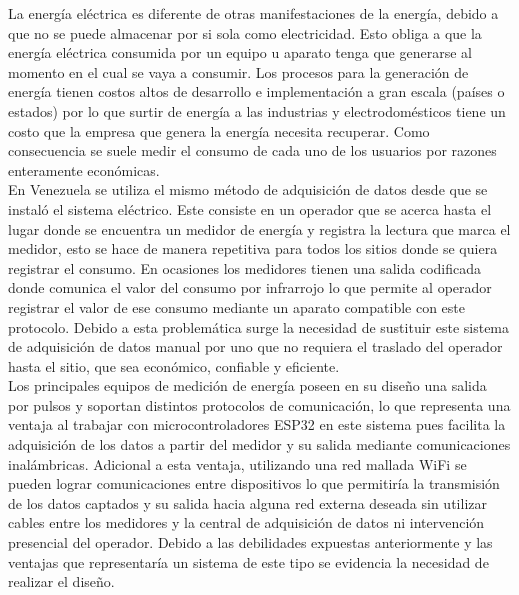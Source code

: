 \documentclass[12pt,letterpaper]{article}
\begin{document}
\vspace{0.3cm}

La energía eléctrica es diferente de otras manifestaciones de la energía, debido a que no se puede almacenar por si sola como electricidad. Esto obliga a que la energía eléctrica consumida por un equipo u aparato tenga que generarse al momento en el cual se vaya a consumir. Los procesos para la generación de energía tienen costos altos de desarrollo e implementación a gran escala (países o estados) por lo que surtir de energía a las industrias y electrodomésticos tiene un costo que la empresa que genera la energía necesita recuperar. Como consecuencia se suele medir el consumo de cada uno de los usuarios por razones enteramente económicas.\\


En Venezuela se utiliza el mismo método de adquisición de datos desde que se instaló el sistema eléctrico. Este consiste en un operador que se acerca hasta el lugar donde se encuentra un medidor de energía y registra la lectura que marca el medidor, esto se hace de manera repetitiva para todos los sitios donde se quiera registrar el consumo. En ocasiones los medidores tienen una salida codificada donde comunica el valor del consumo por infrarrojo lo que permite al operador registrar el valor de ese consumo mediante un aparato compatible con este protocolo. Debido a esta problemática surge la necesidad de sustituir este sistema de adquisición de datos manual por uno que no requiera el traslado del operador hasta el sitio, que sea económico, confiable y eficiente.\\


Los principales equipos de medición de energía poseen en su diseño una salida por pulsos y soportan distintos protocolos de comunicación, lo que representa una ventaja al trabajar con microcontroladores ESP32 en este sistema pues facilita la adquisición de los datos a partir del medidor y su salida mediante comunicaciones inalámbricas. Adicional a esta ventaja, utilizando una red mallada WiFi se pueden lograr comunicaciones entre dispositivos lo que permitiría la transmisión de los datos captados y su salida hacia alguna red externa deseada sin utilizar cables entre los medidores y la central de adquisición de datos ni intervención presencial del operador. Debido a las debilidades expuestas anteriormente y las ventajas que representaría un sistema de este tipo se evidencia la necesidad de realizar el diseño.\\
\end{document}
